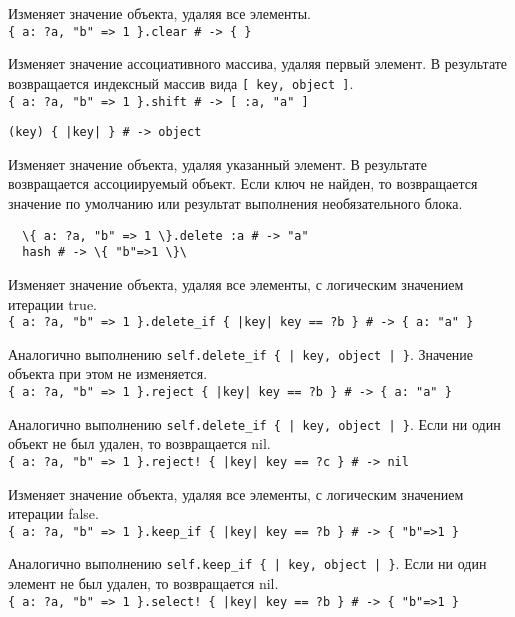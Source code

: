 \begin{methodlist}
  Изменяет значение объекта, удаляя все элементы. 
  \\\verb!{ a: ?a, "b" => 1 }.clear # -> { }!
 
  Изменяет значение ассоциативного массива, удаляя первый элемент. В результате возвращается индексный массив вида \verb![ key, object ]!. 
  \\\verb!{ a: ?a, "b" => 1 }.shift # -> [ :a, "a" ]!
 
  \verb!(key) { |key| } # -> object!

  Изменяет значение объекта, удаляя указанный элемент. В результате возвращается ассоциируемый объект. Если ключ не найден, то возвращается значение по умолчанию или результат выполнения необязательного блока. 
  \begin{verbatim}
  \{ a: ?a, "b" => 1 \}.delete :a # -> "a"
  hash # -> \{ "b"=>1 \}\
  \end{verbatim}
 
  Изменяет значение объекта, удаляя все элементы, с логическим значением итерации true. 
  \\\verb!{ a: ?a, "b" => 1 }.delete_if { |key| key == ?b } # -> { a: "a" }!
 
  Аналогично выполнению \verb!self.delete_if { | key, object | }!. Значение объекта при этом не изменяется. 
  \\\verb!{ a: ?a, "b" => 1 }.reject { |key| key == ?b } # -> { a: "a" }!

  Аналогично выполнению \verb!self.delete_if { | key, object | }!. Если ни один объект не был удален, то возвращается nil. 
  \\\verb/{ a: ?a, "b" => 1 }.reject! { |key| key == ?c } # -> nil/
 
  Изменяет значение объекта, удаляя все элементы, с логическим значением итерации false. 
  \\\verb!{ a: ?a, "b" => 1 }.keep_if { |key| key == ?b } # -> { "b"=>1 }!
 
  Аналогично выполнению \verb!self.keep_if { | key, object | }!. Если ни один элемент не был удален, то возвращается nil. 
  \\\verb/{ a: ?a, "b" => 1 }.select! { |key| key == ?b } # -> { "b"=>1 }/
\end{methodlist}

